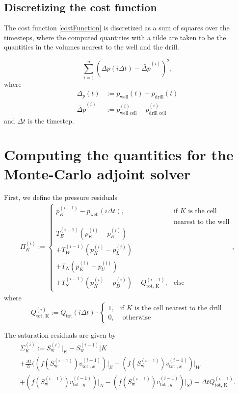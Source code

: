 \documentclass[conference]{IEEEtran}
\begin{document}
\subsection{Discretizing the cost function}
The cost function \eqref{costFunction} is discretized as a sum of squares over the timesteps, where the computed quantities with a tilde are taken to be the quantities in the volumes nearest to the well and the drill.

\begin{equation}
\sum_{i=1}^{n} (\Delta p(i\Delta t) - \tilde{\Delta p}^{(i)})^2,
\end{equation}
where
\begin{align}
\Delta_p(t) &:= p_\text{well}(t) - p_\text{drill}(t) \\
\tilde{\Delta p}^{(i)} &:= p_\text{well cell}^{(i)} - p_\text{drill cell}^{(i)}
\end{align}
and $\Delta t$ is the timestep.

\section{Computing the quantities for the Monte-Carlo adjoint solver}

First, we define the pressure residuals
\begin{multline}
\Pi_K^{(i)} := \begin{cases} p_K^{(i-1)} - p_\text{well}(i\Delta t), & \text{if } K \text{ is the cell}\\&\text{nearest to the well}\\T_E^{(i-1)} (p_K^{(i)} - p_R^{(i)}) \\+ T_W^{(i-1)} (p_K^{(i)} - p_L^{(i)}) \\+ T_N ( p_K^{(i)} - p_U^{(i)}) \\+ T_S^{(i-1)} (p_K^{(i)} - p_D^{(i)}) - Q_\text{tot, K}^{(i-1)}, & \text{else}\end{cases}, 
\end{multline}
where
\begin{equation}
Q_\text{tot, K}^{(i)} := Q_\text{tot}(i\Delta t) \cdot \begin{cases} 1, &\text{if } K \text{ is the cell nearest to the drill}\\0, &\text{ otherwise} \end{cases}
\end{equation}

The saturation residuals are given by
\begin{multline}
\Sigma_K^{(i)} := S_\text{w}^{(i)}\lvert_K - S_\text{w}^{(i-1)}\lvert{K} \\+ \frac{\Delta t}{h} \biggr((f(S_\text{w}^{(i-1)})v_{\text{tot }, x}^{(i-1)})\lvert_E - (f(S_\text{w}^{(i-1)})v_{\text{tot }, x}^{(i-1)})\lvert_W \\+ (f(S_\text{w}^{(i-1)})v_{\text{tot }, y}^{(i-1)})\lvert_N - (f(S_\text{w}^{(i-1)})v_{\text{tot }, y}^{(i-1)})\lvert_S\biggr) - \Delta t Q_\text{tot, K}^{(i-1)}.
\end{multline}
\end{document}
